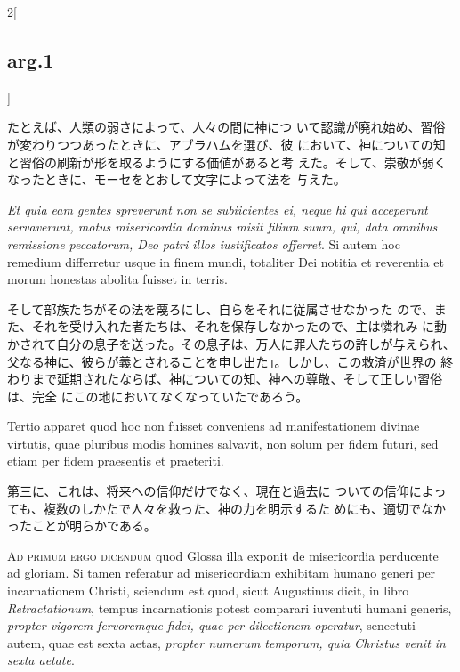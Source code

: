 \documentclass[paper=a4paper,fontsize=10pt,jafontsize=9pt,titlepage]{jlreq}
\begin{document}
\begin{paracol}{2}[\subsection{arg.1}]
\switchcolumn

たとえば、人類の弱さによって、人々の間に神につ
 いて認識が廃れ始め、習俗が変わりつつあったときに、アブラハムを選び、彼
 において、神についての知と習俗の刷新が形を取るようにする価値があると考
 えた。そして、崇敬が弱くなったときに、モーセをとおして文字によって法を
 与えた。

\switchcolumn*

{\itshape Et quia eam
gentes spreverunt non se subiicientes ei, neque hi qui acceperunt
servaverunt, motus misericordia dominus misit filium suum, qui, data
omnibus remissione peccatorum, Deo patri illos iustificatos offerret}. Si
autem hoc remedium differretur usque in finem mundi, totaliter Dei
notitia et reverentia et morum honestas abolita fuisset in
terris.

\switchcolumn

そして部族たちがその法を蔑ろにし、自らをそれに従属させなかった
 ので、また、それを受け入れた者たちは、それを保存しなかったので、主は憐れみ
 に動かされて自分の息子を送った。その息子は、万人に罪人たちの許しが与えられ、
 父なる神に、彼らが義とされることを申し出た」。しかし、この救済が世界の
 終わりまで延期されたならば、神についての知、神への尊敬、そして正しい習俗は、完全
 にこの地においてなくなっていたであろう。

\switchcolumn*

Tertio apparet quod hoc non fuisset conveniens ad
manifestationem divinae virtutis, quae pluribus modis homines salvavit,
non solum per fidem futuri, sed etiam per fidem praesentis et
praeteriti.

\switchcolumn

第三に、これは、将来への信仰だけでなく、現在と過去に
 ついての信仰によっても、複数のしかたで人々を救った、神の力を明示するた
 めにも、適切でなかったことが明らかである。

\switchcolumn*[\subsection{ad.1}]

{\scshape Ad primum ergo dicendum} quod Glossa illa
exponit de misericordia perducente ad gloriam. Si tamen referatur ad
misericordiam exhibitam humano generi per incarnationem Christi,
sciendum est quod, sicut Augustinus dicit, in libro {\itshape Retractationum},
tempus incarnationis potest comparari iuventuti humani generis, {\itshape propter
vigorem fervoremque fidei, quae per dilectionem operatur}, senectuti
autem, quae est sexta aetas, {\itshape propter numerum temporum, quia Christus
venit in sexta aetate}.


\end{paracol}
\end{document}
